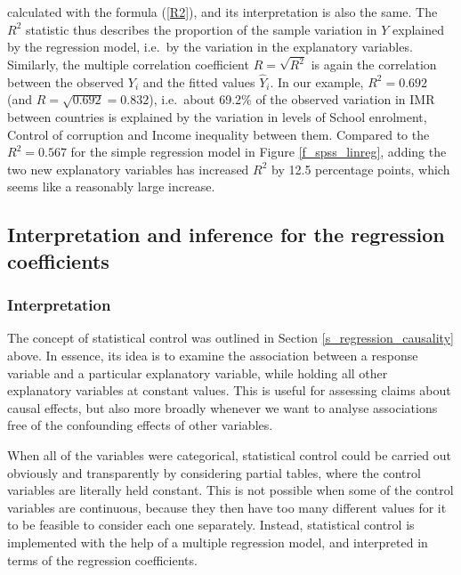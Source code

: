 \begin{itemize}
calculated with the formula (\ref{R2}), and its interpretation is also
the same. The $R^{2}$ statistic thus describes the proportion of the
sample variation in $Y$ explained by the regression model, i.e.\ by the
variation in the explanatory variables. Similarly, the multiple
correlation coefficient $R=\sqrt{R^{2}}$ is again the correlation
between the observed $Y_{i}$ and the fitted values $\hat{Y}_{i}$. In our
example, $R^{2}=0.692$ (and $R=\sqrt{0.692}=0.832$), i.e.\ about 69.2\%
of the observed variation in IMR between countries is
explained by the variation in levels of School enrolment, Control of
corruption and Income inequality between them.
Compared to the
$R^{2}=0.567$ for the simple regression model in Figure
\ref{f_spss_linreg}, adding the two new explanatory variables
has increased $R^{2}$ by 12.5 percentage points, which seems
like a reasonably large increase.
\end{itemize}

\subsection{Interpretation and inference for the regression coefficients}
\label{ss_regression_multiple_beta}

\subsubsection{Interpretation}

The concept of statistical control was outlined in Section
\ref{s_regression_causality} above. In essence, its idea is to examine the
association between a response variable and a particular explanatory
variable, while holding all other explanatory variables at constant
values. This is useful for assessing claims about causal effects, but
also more broadly whenever we want to analyse associations free of the
confounding effects of other variables.

When all of the variables were  categorical, statistical control could
be carried out obviously and transparently by considering partial
tables, where the control variables are literally held constant. This is
not possible when some of the control variables are continuous, because
they then have too many different values for it to be feasible to
consider each one separately. Instead, statistical control is
implemented with the help of a multiple regression model, and interpreted in
terms of the regression coefficients.


